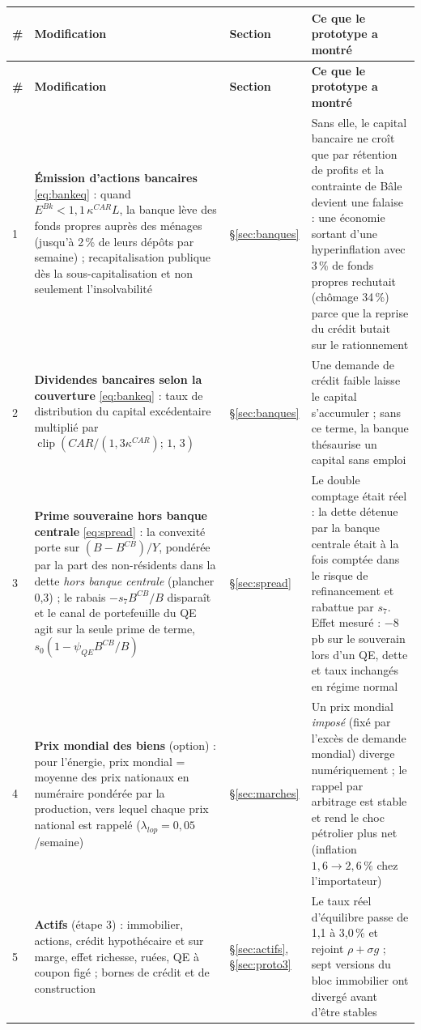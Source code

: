 \documentclass[11pt,a4paper]{article}
\newcommand{\clip}[3]{\operatorname{clip}\!\left(#1;\,#2,\,#3\right)}
\begin{document}
\begin{center}\small
\begin{longtable}{p{0.5cm}p{6.6cm}p{2.1cm}p{5.8cm}}
\toprule
\textbf{\#} & \textbf{Modification} & \textbf{Section} & \textbf{Ce que le prototype a montré}\\
\midrule
\endfirsthead
\toprule
\textbf{\#} & \textbf{Modification} & \textbf{Section} & \textbf{Ce que le prototype a montré}\\
\midrule
\endhead
1 & \textbf{Émission d'actions bancaires} \eqref{eq:bankeq} : quand $E^{Bk}<1{,}1\,\kappa^{CAR}L$, la banque lève des fonds propres auprès des ménages (jusqu'à 2\,\% de leurs dépôts par semaine) ; recapitalisation publique dès la sous-capitalisation et non seulement l'insolvabilité & \S\ref{sec:banques} & Sans elle, le capital bancaire ne croît que par rétention de profits et la contrainte de Bâle devient une falaise : une économie sortant d'une hyperinflation avec 3\,\% de fonds propres rechutait (chômage 34\,\%) parce que la reprise du crédit butait sur le rationnement\\
2 & \textbf{Dividendes bancaires selon la couverture} \eqref{eq:bankeq} : taux de distribution du capital excédentaire multiplié par $\clip{CAR/(1{,}3\kappa^{CAR})}{1}{3}$ & \S\ref{sec:banques} & Une demande de crédit faible laisse le capital s'accumuler ; sans ce terme, la banque thésaurise un capital sans emploi\\
3 & \textbf{Prime souveraine hors banque centrale} \eqref{eq:spread} : la convexité porte sur $(B-B^{CB})/Y$, pondérée par la part des non-résidents dans la dette \emph{hors banque centrale} (plancher 0,3) ; le rabais $-s_7B^{CB}/B$ disparaît et le canal de portefeuille du QE agit sur la seule prime de terme, $s_0(1-\psi_{QE}B^{CB}/B)$ & \S\ref{sec:spread} & Le double comptage était réel : la dette détenue par la banque centrale était à la fois comptée dans le risque de refinancement et rabattue par $s_7$. Effet mesuré : $-8$ pb sur le souverain lors d'un QE, dette et taux inchangés en régime normal\\
4 & \textbf{Prix mondial des biens} (option) : pour l'énergie, prix mondial = moyenne des prix nationaux en numéraire pondérée par la production, vers lequel chaque prix national est rappelé ($\lambda_{lop}=0{,}05$/semaine) & \S\ref{sec:marches} & Un prix mondial \emph{imposé} (fixé par l'excès de demande mondial) diverge numériquement ; le rappel par arbitrage est stable et rend le choc pétrolier plus net (inflation $1{,}6\to2{,}6\,\%$ chez l'importateur)\\
5 & \textbf{Actifs} (étape 3) : immobilier, actions, crédit hypothécaire et sur marge, effet richesse, ruées, QE à coupon figé ; bornes de crédit et de construction & \S\ref{sec:actifs}, \S\ref{sec:proto3} & Le taux réel d'équilibre passe de 1,1 à 3,0\,\% et rejoint $\rho+\sigma g$ ; sept versions du bloc immobilier ont divergé avant d'être stables\\
\bottomrule
\end{longtable}
\end{center}
\end{document}
